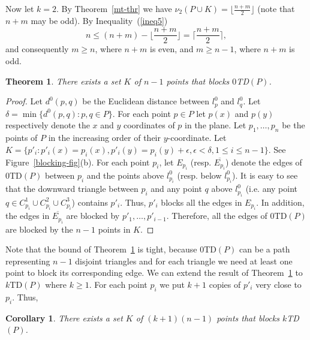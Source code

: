 \documentclass[11pt,a4paper]{article}
\newcommand{\kTD}[2]{$#1$\text{-}TD#2}
\newtheorem{corollary}{Corollary}
\newtheorem{theorem}{Theorem}
\begin{document}
Now let $k=2$. By Theorem~\ref{mt-thr} we have $\nu_2(P\cup K)= \lfloor\frac{n+m}{2}\rfloor$ (note that $n+m$ may be odd). By Inequality~(\ref{ineq5}) $$n\le (n+m)-\lfloor\frac{n+m}{2}\rfloor=\lceil\frac{n+m}{2}\rceil,$$ and consequently $m\ge n$, where $n+m$ is even, and $m\ge n-1$, where $n+m$ is odd.  

\begin{theorem}
\label{blocking-thr2}
 There exists a set $K$ of $n-1$ points that blocks \kTD{0}{$(P)$}.
\end{theorem}
\begin{proof}
Let $d^0(p,q)$ be the Euclidean distance between $l^0_p$ and $l^0_q$. Let $\delta = \min\{d^0(p,q): p,q\in P\}$.
 For each point $p\in P$ let $p(x)$ and $p(y)$ respectively denote the $x$ and $y$ coordinates of $p$ in the plane. Let $p_1, \dots, p_n$ be the points of $P$ in the increasing order of their $y$-coordinate. Let $K=\{p'_i: p'_i(x)=p_i(x), p'_i(y)=p_i(y)+\epsilon, \epsilon<\delta, 1\le i\le n-1\}$. See Figure~\ref{blocking-fig}(b). For each point $p_i$, let $E_{p_i}$ (resp. $\overline{E_{p_i}}$) denote the edges of \kTD{0}{$(P)$} between $p_i$ and the points above $l^0_{p_i}$ (resp. below $l^0_{p_i}$). It is easy to see that the downward triangle between $p_i$ and any point $q$ above $l^0_{p_i}$ (i.e. any point $q\in C^1_{p_i}\cup C^2_{p_i}\cup C^3_{p_i}$) contains $p'_i$. Thus, $p'_i$ blocks all the edges in $E_{p_i}$. In addition, the edges in $\overline{E_{p_i}}$ are blocked by $p'_1, \dots, p'_{i-1}$. Therefore, all the edges of \kTD{0}{$(P)$} are blocked by the $n-1$ points in $K$.
\end{proof}
Note that the bound of Theorem~\ref{blocking-thr2} is tight, because \kTD{0}{$(P)$} can be a path representing $n-1$ disjoint triangles and for each triangle we need at least one point to block its corresponding edge. 
We can extend the result of Theorem~\ref{blocking-thr2} to \kTD{k}{$(P)$} where $k\ge 1$. For each point $p_i$ we put $k+1$ copies of $p'_i$ very close to $p_i$. Thus, 

\begin{corollary}
 There exists a set $K$ of $(k+1)(n-1)$ points that blocks \kTD{k}{$(P)$}.
\end{corollary}
\end{document}
